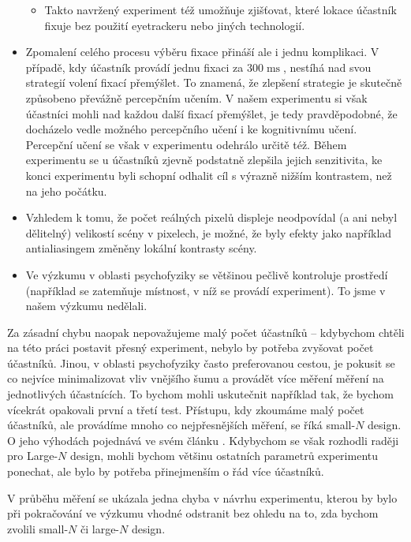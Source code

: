 \begin{itemize}
\begin{itemize}
\item Takto navržený experiment též umožňuje zjišťovat, které lokace účastník
fixuje bez použití eyetrackeru nebo jiných technologií.

\end{itemize}

\item Zpomalení celého procesu výběru fixace přináší ale i jednu komplikaci. V případě, kdy
účastník provádí jednu fixaci za $300\operatorname{ms}$, nestíhá nad svou
strategií volení fixací přemýšlet. To znamená, že zlepšení strategie je
skutečně způsobeno převážně percepčním učením. V našem experimentu si však
účastníci mohli nad každou další fixací přemýšlet, je tedy pravděpodobné, že
docházelo vedle možného percepčního učení  i ke kognitivnímu učení. Percepční
učení se však v experimentu odehrálo určitě též.  Během experimentu se u
účastníků zjevně podstatně zlepšila jejich senzitivita, ke konci experimentu
byli schopní odhalit cíl s výrazně nižším kontrastem, než na jeho počátku.


\item Vzhledem k tomu, že počet reálných pixelů displeje neodpovídal (a ani
nebyl dělitelný) velikostí scény v pixelech, je možné, že byly efekty jako
například antialiasingem změněny lokální kontrasty scény.

\item Ve výzkumu v oblasti psychofyziky se většinou
pečlivě kontroluje prostředí (například se zatemňuje místnost, v níž se provádí experiment). To jsme v našem výzkumu nedělali.

\end{itemize}

Za zásadní chybu naopak nepovažujeme malý počet účastníků -- kdybychom chtěli
na této práci postavit přesný experiment, nebylo by potřeba zvyšovat počet
účastníků. Jinou, v oblasti psychofyziky často preferovanou cestou, je pokusit
se co nejvíce minimalizovat vliv vnějšího šumu a provádět více měření měření na
jednotlivých účastnících. To bychom mohli uskutečnit například tak, že bychom
vícekrát opakovali první a třetí test. Přístupu, kdy zkoumáme malý počet
účastníků, ale provádíme mnoho co nejpřesnějších měření, se říká small-$N$
design. O jeho výhodách pojednává ve svém článku \citet{SmallN}. Kdybychom se
však rozhodli raději pro Large-$N$ design, mohli bychom většinu ostatních
parametrů experimentu ponechat, ale bylo by potřeba přinejmenším o řád více
účastníků.

V průběhu měření se ukázala jedna chyba v návrhu experimentu, kterou by
bylo při pokračování ve výzkumu vhodné odstranit bez ohledu na to, zda bychom
zvolili small-$N$ či large-$N$ design. 

